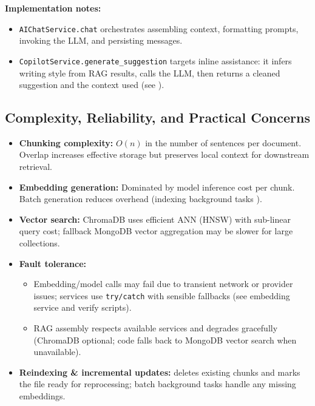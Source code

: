 \textbf{Implementation notes:}
\begin{itemize}
    \item \texttt{AIChatService.chat} orchestrates assembling context, formatting prompts, invoking the LLM, and persisting messages.
    \item \texttt{CopilotService.generate\_suggestion} targets inline assistance: it infers writing style from RAG results, calls the LLM, then returns a cleaned suggestion and the context used (see \texttt{}).
\end{itemize}

\subsection*{Complexity, Reliability, and Practical Concerns}
\label{subsec:complexity-reliability-practical}

\begin{itemize}
    \item \textbf{Chunking complexity:} $O(n)$ in the number of sentences per document. Overlap increases effective storage but preserves local context for downstream retrieval.
    \item \textbf{Embedding generation:} Dominated by model inference cost per chunk. Batch generation reduces overhead (indexing background tasks \texttt{}).
    \item \textbf{Vector search:} ChromaDB uses efficient ANN (HNSW) with sub-linear query cost; fallback MongoDB vector aggregation may be slower for large collections.
    \item \textbf{Fault tolerance:}
    \begin{itemize}
        \item Embedding/model calls may fail due to transient network or provider issues; services use \texttt{try/catch} with sensible fallbacks (see embedding service and verify scripts).
        \item RAG assembly respects available services and degrades gracefully (ChromaDB optional; code falls back to MongoDB vector search when unavailable).
    \end{itemize}
    \item \textbf{Reindexing \& incremental updates:} \texttt{} deletes existing chunks and marks the file ready for reprocessing; batch background tasks handle any missing embeddings.
\end{itemize}

